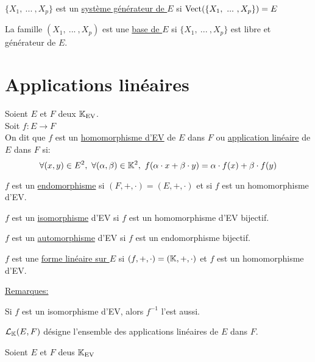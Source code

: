 \documentclass[12pt,twoside,a4paper]{article}
\begin{document}
		\begin{defi}
			$\{X_1,\ ...\ ,X_p \}$ est un \underline{système générateur de $E$} si $\mathrm{Vect}(\{X_1,\ ...\ ,X_p \})=E$
		\end{defi}
		\begin{defi}
			La famille $(X_1,\ ...\ ,X_p)$ est une \underline{base de $E$} si $\{X_1,\ ...\ ,X_p\}$ est libre et générateur de $E$.
		\end{defi}
	\section{Applications linéaires}
		\begin{defi}
			Soient $E$ et $F$ deux $\mathbb{K}_\mathrm{EV}$.\\
			Soit $f:E\rightarrow F$\\
			On dit que $f$ est un \underline{homomorphisme d'EV} de $E$ dans $F$ ou \underline{application linéaire} de $E$ dans $F$ si:
			$$\forall (x,y)\in E^{2},\ \forall(\alpha,\beta)\in\K^{2},\ f(\alpha\cdot x+\beta\cdot y)=\alpha\cdot f(x)+\beta\cdot f(y)$$
		\end{defi}
		\begin{defi}
			\begin{liste}
				\item $f$ est un \underline{endomorphisme} si $(F,+,\cdot)=(E,+,\cdot)$ et si $f$ est un homomorphisme d'EV.
				\item $f$ est un \underline{isomorphisme} d'EV si $f$ est un homomorphisme d'EV bijectif.
				\item $f$ est un \underline{automorphisme} d'EV si $f$ est un endomorphisme bijectif.
				\item $f$ est une \underline{forme linéaire sur $E$} si $(f,+,\cdot)=(\mathbb{K},+,\cdot)$ et $f$ est un homomorphisme d'EV.
			\end{liste}
		\end{defi}
		\begin{flushleft}
			\underline{Remarques:}
			\begin{liste}
				\item Si $f$ est un isomorphisme d'EV, alors $f^{-1}$ l'est aussi.
				\item $\mathcal{L}_{\mathbb{K}}(E,F)$ désigne l'ensemble des applications linéaires de $E$ dans $F$.
			\end{liste}
		\end{flushleft}
		\begin{defi}
			Soient $E$ et $F$ deus $\mathbb{K}_\mathrm{EV}$
		\end{defi}
\end{document}

